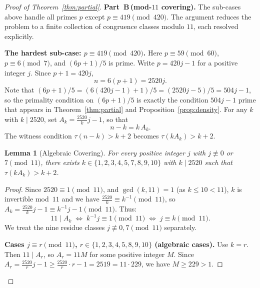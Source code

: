 \documentclass[11pt]{article}
\newtheorem{lemma}{Lemma}
\begin{document}
\begin{proof}[Proof of Theorem~\ref{thm:partial}]
\medskip\noindent\textbf{Part~B\,(mod-$11$ covering).}
The sub-cases above handle all primes $p$ except $p\equiv 419\pmod{420}$.
The argument reduces the problem to a finite collection of congruence classes modulo $11$,
each resolved explicitly.

\medskip
\noindent\textbf{The hardest sub-case: $p \equiv 419 \pmod{420}$.}
Here $p \equiv 59 \pmod{60}$, $p \equiv 6 \pmod 7$, and $(6p+1)/5$ is prime.
Write $p = 420j - 1$ for a positive integer $j$.   Since $p+1 = 420j$,
\[
  n = 6(p+1) = 2520j.
\]
Note that $(6p+1)/5 = (6(420j-1)+1)/5 = (2520j-5)/5 = 504j-1$, so the primality
condition on $(6p+1)/5$ is exactly the condition $504j-1$ prime that appears in
Theorem~\ref{thm:partial} and Proposition~\ref{prop:density}.
For any $k$ with $k \mid 2520$, set $A_k = \tfrac{2520}{k} j - 1$, so that
\[
  n - k = k \, A_k.
\]
The witness condition $\tau(n-k) > k+2$ becomes $\tau(k A_k) > k+2$.

\begin{lemma}[Algebraic Covering]\label{lem:covering}
For every positive integer $j$ with $j \not\equiv 0$ or $7 \pmod{11}$,
there exists $k \in \{1,2,3,4,5,7,8,9,10\}$ with $k \mid 2520$ such that
$\tau(k A_k) > k + 2$.
\end{lemma}

\begin{proof}
Since $2520 \equiv 1 \pmod{11}$, and $\gcd(k,11)=1$ (as $k \le 10 < 11$), $k$ is invertible
mod~$11$ and we have $\tfrac{2520}{k} \equiv k^{-1} \pmod{11}$,
so $A_k = \tfrac{2520}{k}j - 1 \equiv k^{-1}j - 1 \pmod{11}$.
Thus:
\[
  11 \mid A_k \;\iff\; k^{-1}j \equiv 1 \pmod{11} \;\iff\; j \equiv k \pmod{11}.
\]
We treat the nine residue classes $j \not\equiv 0, 7 \pmod{11}$ separately.

\textbf{Cases $j \equiv r \pmod{11}$, $r \in \{1,2,3,4,5,8,9,10\}$ (algebraic cases).}
Use $k = r$.  Then $11 \mid A_r$, so $A_r = 11M$ for some positive integer $M$.
Since $A_r = \tfrac{2520}{r} j - 1 \ge \tfrac{2520}{r} \cdot r - 1 = 2519 = 11 \cdot 229$,
we have $M \ge 229 > 1$.


\end{proof}
\end{proof}
\end{document}
